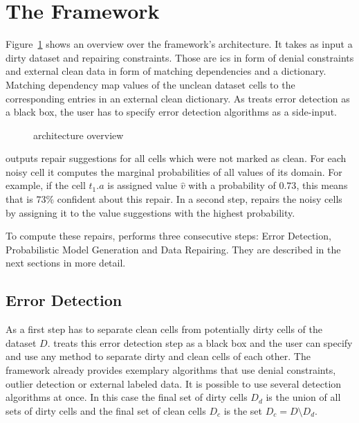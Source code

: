 \section{The \holoclean{} Framework}\label{sec:framework}
  Figure~\ref{fig:architecture} shows an overview over the framework's architecture.
  It takes as input a dirty dataset and repairing constraints.
  Those are \glspl{ic} in form of denial constraints and external clean data in form of matching dependencies and a dictionary.
  Matching dependency map values of the unclean dataset cells to the corresponding entries in an external clean dictionary.
  As \holoclean{} treats error detection as a black box, the user has to specify error detection algorithms as a side-input.
   
  \begin{figure}
    \centering
    
    \caption{\holoclean{} architecture overview}
    \label{fig:architecture}
  \end{figure}

  \holoclean{} outputs repair suggestions for all cells which were not marked as clean.
  For each noisy cell it computes the marginal probabilities of all values of its domain.
  For example, if the cell $t_1.a$ is assigned value $\hat{v}$ with a probability of $0.73$, this means that \holoclean{} is $73\%$ confident about this repair.
  In a second step, \holoclean{} repairs the noisy cells by assigning it to the value suggestions with the highest probability.
  
  To compute these repairs, \holoclean{} performs three consecutive steps: \textsf{Error Detection}, \textsf{Probabilistic Model Generation} and \textsf{Data Repairing}.
  They are described in the next sections in more detail.
 
  \subsection{Error Detection}
  As a first step \holoclean{} has to separate clean cells from potentially dirty cells of the dataset $D$.
  \holoclean{} treats this error detection step as a black box and the user can specify and use any method to separate dirty and clean cells of each other.
  The framework already provides exemplary algorithms that use denial constraints, outlier detection or external labeled data.
  It is possible to use several detection algorithms at once.
  In this case the final set of dirty cells $D_d$ is the union of all sets of dirty cells and the final set of clean cells $D_c$ is the set $D_c = D \setminus D_d$.

